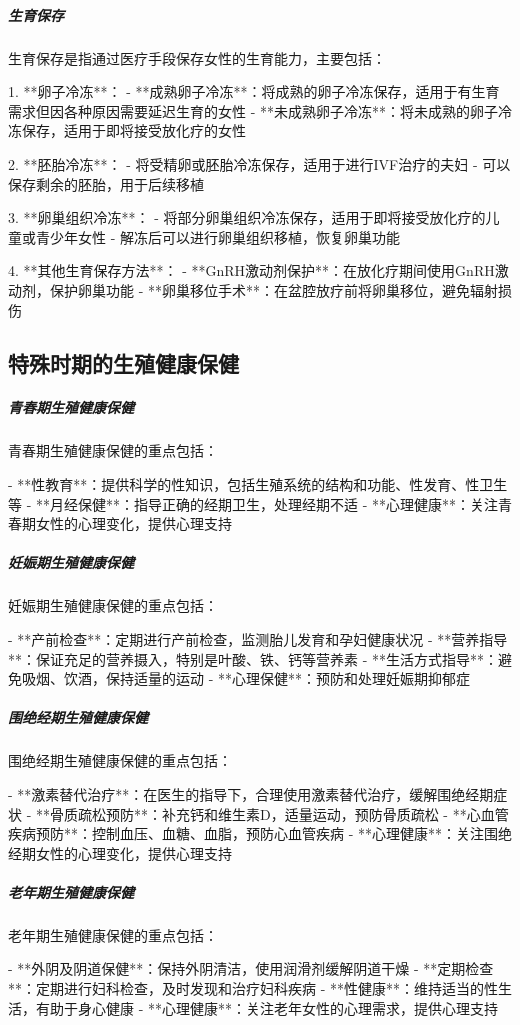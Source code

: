 \begin{enumerate}
\subparagraph{生育保存}

生育保存是指通过医疗手段保存女性的生育能力，主要包括：

1. **卵子冷冻**：
   - **成熟卵子冷冻**：将成熟的卵子冷冻保存，适用于有生育需求但因各种原因需要延迟生育的女性
   - **未成熟卵子冷冻**：将未成熟的卵子冷冻保存，适用于即将接受放化疗的女性

2. **胚胎冷冻**：
   - 将受精卵或胚胎冷冻保存，适用于进行IVF治疗的夫妇
   - 可以保存剩余的胚胎，用于后续移植

3. **卵巢组织冷冻**：
   - 将部分卵巢组织冷冻保存，适用于即将接受放化疗的儿童或青少年女性
   - 解冻后可以进行卵巢组织移植，恢复卵巢功能

4. **其他生育保存方法**：
   - **GnRH激动剂保护**：在放化疗期间使用GnRH激动剂，保护卵巢功能
   - **卵巢移位手术**：在盆腔放疗前将卵巢移位，避免辐射损伤

\subsection{特殊时期的生殖健康保健}

\subparagraph{青春期生殖健康保健}

青春期生殖健康保健的重点包括：

- **性教育**：提供科学的性知识，包括生殖系统的结构和功能、性发育、性卫生等
- **月经保健**：指导正确的经期卫生，处理经期不适
- **心理健康**：关注青春期女性的心理变化，提供心理支持

\subparagraph{妊娠期生殖健康保健}

妊娠期生殖健康保健的重点包括：

- **产前检查**：定期进行产前检查，监测胎儿发育和孕妇健康状况
- **营养指导**：保证充足的营养摄入，特别是叶酸、铁、钙等营养素
- **生活方式指导**：避免吸烟、饮酒，保持适量的运动
- **心理保健**：预防和处理妊娠期抑郁症

\subparagraph{围绝经期生殖健康保健}

围绝经期生殖健康保健的重点包括：

- **激素替代治疗**：在医生的指导下，合理使用激素替代治疗，缓解围绝经期症状
- **骨质疏松预防**：补充钙和维生素D，适量运动，预防骨质疏松
- **心血管疾病预防**：控制血压、血糖、血脂，预防心血管疾病
- **心理健康**：关注围绝经期女性的心理变化，提供心理支持

\subparagraph{老年期生殖健康保健}

老年期生殖健康保健的重点包括：

- **外阴及阴道保健**：保持外阴清洁，使用润滑剂缓解阴道干燥
- **定期检查**：定期进行妇科检查，及时发现和治疗妇科疾病
- **性健康**：维持适当的性生活，有助于身心健康
- **心理健康**：关注老年女性的心理需求，提供心理支持


\end{enumerate}
